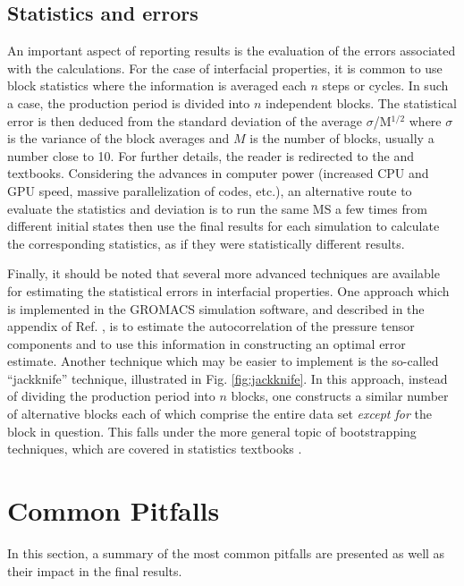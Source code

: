\documentclass[9pt,bestpractices]{livecoms}
\begin{document}
\subsection{Statistics and errors}

An important aspect of reporting results is the evaluation of the errors
associated with the calculations. For the case of interfacial properties, it is
common to use block statistics where the information is averaged each
$n$ steps or cycles. In such a case, the production period is divided
into $n$ independent blocks. The statistical error is then deduced from
the standard deviation of the average ${\sigma}$/M$^{\mathrm{1/2}}$ where
${\sigma}$ is the variance of the block averages and $M$ is the number
of blocks, usually a number close to 10. For further details, the reader is
redirected to the \citet{allen2017}
and \citet{frenkel2002}
textbooks. Considering the advances in computer power (increased CPU and GPU speed,
massive parallelization of codes, etc.), an alternative route to evaluate the
statistics and deviation is to run the same MS a few times from different
initial states then use the final results for each simulation to calculate the
corresponding statistics, as if they were statistically different results.

Finally, it should be noted that several more advanced techniques are available
for estimating the statistical errors in interfacial properties. One approach
which is implemented in the GROMACS simulation software, and described in the
appendix of Ref. \citep{hess2002}, is to estimate the autocorrelation of the
pressure tensor components and to use this information in constructing an
optimal error estimate. Another technique which may be easier to implement is
the so-called ``jackknife'' technique, illustrated in Fig. \ref{fig:jackknife}.
In this approach, instead of dividing the production period into $n$ blocks,
one constructs a similar number of alternative blocks each of which comprise the entire data set
\textit{except for} the block in question.  This falls under the more general topic of
bootstrapping techniques, which are covered in statistics textbooks \citep{efron1982}.

\section{Common Pitfalls}

In this section, a summary of the most common pitfalls are presented as well as
their impact in the final results.
\end{document}
